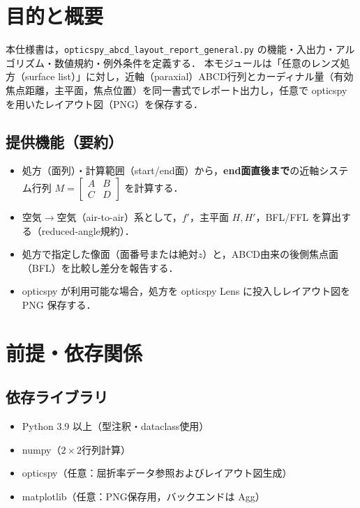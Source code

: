 \documentclass[a4paper,11pt]{jsarticle} %
\begin{document}
\section{目的と概要}
本仕様書は，\texttt{opticspy\_abcd\_layout\_report\_general.py} の機能・入出力・アルゴリズム・数値規約・例外条件を定義する．
本モジュールは「任意のレンズ処方（surface list）」に対し，近軸（paraxial）ABCD行列とカーディナル量（有効焦点距離，主平面，焦点位置）を同一書式でレポート出力し，任意で opticspy を用いたレイアウト図（PNG）を保存する．

\subsection{提供機能（要約）}
\begin{itemize}
  \item 処方（面列）・計算範囲（start/end面）から，\textbf{end面直後まで}の近軸システム行列 $M=\begin{bmatrix}A&B\\C&D\end{bmatrix}$ を計算する．
  \item 空気$\rightarrow$空気（air-to-air）系として，$f'$，主平面 $H,H'$，BFL/FFL を算出する（reduced-angle規約）．
  \item 処方で指定した像面（面番号または絶対$z$）と，ABCD由来の後側焦点面（BFL）を比較し差分を報告する．
  \item opticspy が利用可能な場合，処方を opticspy Lens に投入しレイアウト図を PNG 保存する．
\end{itemize}

\section{前提・依存関係}
\subsection{依存ライブラリ}
\begin{itemize}
  \item Python 3.9 以上（型注釈・dataclass使用）
  \item numpy（$2\times2$行列計算）
  \item opticspy（任意：屈折率データ参照およびレイアウト図生成）
  \item matplotlib（任意：PNG保存用，バックエンドは Agg）
\end{itemize}
\end{document}
